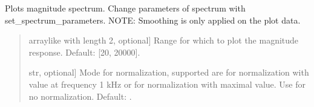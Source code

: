 \documentclass[letterpaper,10pt,english]{sphinxmanual}
\begin{document}
\begin{fulllineitems}
\begin{fulllineitems}
\begin{quote}
\begin{description}
\begin{description}
\end{description}

\end{description}\end{quote}

\end{fulllineitems}


\begin{fulllineitems}
\label{\detokenize{classes:dsptools.classes.signal_class.Signal.plot_magnitude}}
\pysigstartsignatures
{}
\pysigstopsignatures
\sphinxAtStartPar
Plots magnitude spectrum.
Change parameters of spectrum with set\_spectrum\_parameters.
NOTE: Smoothing is only applied on the plot data.
\begin{quote}\begin{description}
\begin{description}
\sphinxlineitem{\sphinxstylestrong{range\_hz}}{[}array\sphinxhyphen{}like with length 2, optional{]}
\sphinxAtStartPar
Range for which to plot the magnitude response.
Default: {[}20, 20000{]}.

\sphinxlineitem{\sphinxstylestrong{normalize}}{[}str, optional{]}
\sphinxAtStartPar
Mode for normalization, supported are  for normalization
with value at frequency 1 kHz or  for normalization with
maximal value. Use  for no normalization. Default: .


\end{description}
\end{description}
\end{quote}
\end{fulllineitems}
\end{fulllineitems}
\end{document}
